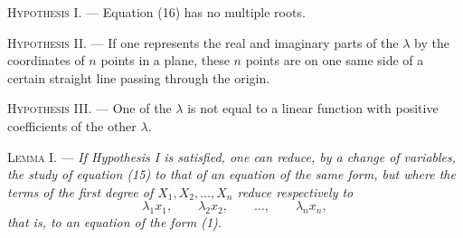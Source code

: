 \documentclass[11pt]{article}
\begin{document}
\noindent\textsc{Hypothesis I.} --- Equation (16) has no multiple roots.

\noindent\textsc{Hypothesis II.} --- If one represents the real and imaginary parts of the $\lambda$ by the coordinates of $n$ points in a plane, these $n$ points are on one same side of a certain straight line passing through the origin.

\noindent\textsc{Hypothesis III.} --- One of the $\lambda$ is not equal to a linear function with positive coefficients of the other $\lambda$.

\noindent\textsc{Lemma I.} --- \emph{If Hypothesis I is satisfied, one can reduce, by a change of variables, the study of equation (15) to that of an equation of the same form, but where the terms of the first degree of $X_1,X_2,\ldots,X_n$ reduce respectively to}
\[
\lambda_1x_1,\qquad \lambda_2x_2,\qquad \ldots,\qquad \lambda_nx_n,
\]
\emph{that is, to an equation of the form (1).}
\end{document}
